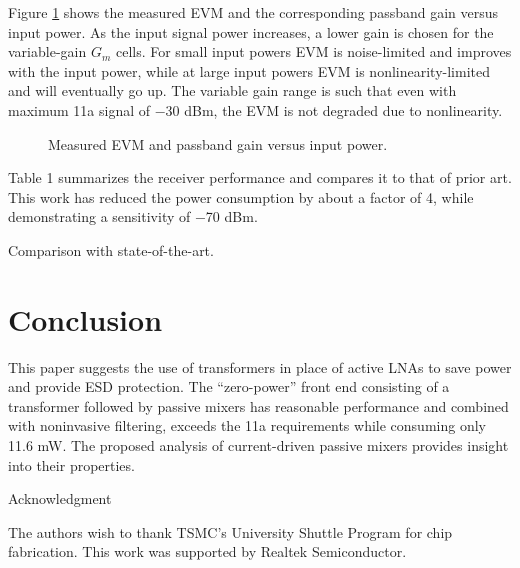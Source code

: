 Figure \ref{evmpin} shows the measured EVM and the corresponding passband gain versus input power. As the input signal power increases, a lower gain
is chosen for the variable-gain $G_m$ cells. For small input powers EVM is noise-limited and improves with the input power, while at large input powers
EVM is nonlinearity-limited and will eventually go up. The variable gain range is such that even with maximum 11a signal of $-$30 dBm, the EVM is not
degraded due to nonlinearity.
\begin{figure}[htb]
\vspace{2.65in}
\caption{Measured EVM and passband gain versus input power.}
\vspace{0.1in}
\label{evmpin}
\end{figure}

Table 1 summarizes the receiver performance and compares it to that of prior art. This work has reduced the power consumption by about a factor of 4,
while demonstrating a sensitivity of $-$70 dBm. 
\begin{table}[htb]
\caption{Comparison with state-of-the-art.}
\vspace{3.05in}
\label{table}
\end{table}

\section{Conclusion}
This paper suggests the use of transformers in place of active LNAs to save power and provide ESD protection. The ``zero-power'' front end consisting
of a transformer followed by passive mixers has reasonable performance and combined with noninvasive filtering, exceeds the 11a requirements while
consuming only 11.6 mW.
The proposed analysis of current-driven passive mixers provides insight into their properties.


\begin{center} {\large Acknowledgment}
\end{center}
The authors wish to thank TSMC's University Shuttle Program for chip fabrication.
This work was supported by Realtek Semiconductor.


